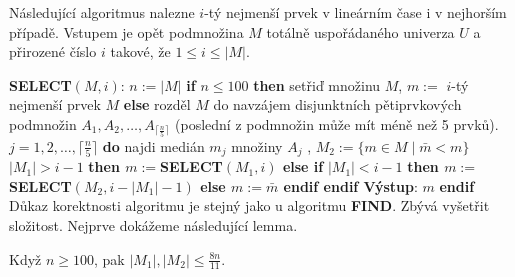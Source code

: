 \documentclass[a4paper,12pt]{article}
\begin{document}
Následující algoritmus nalezne $i$-tý nejmenší 
prvek v lineárním čase i v nejhorším případě.  Vstupem 
je opět podmnožina $M$ totálně 
uspořádaného univerza $U$ a přirozené číslo $i$ takové, že 
$1\le i\le |M|$.  

{\bf SELECT$(M,i)$}:\newline 
$n:=|M|$\newline 
{\bf if} $n\le 100$ {\bf then\newline 
\phantom{{\rm---}}}setřiď množinu $M$, $m:=$ $i$-tý nejmenší 
prvek $M$\newline 
{\bf else\newline 
\phantom{{\rm---}}}rozděl $M$ do navzájem disjunktních 
pětiprvkových podmnožin $A_1,A_2,\dots,A_{\lceil\frac n5\rceil}$\newline 
\phantom{---}(poslední z podmnožin může mít méně než 5 prvků).\newline 
{} $j=1,2,\dots,\lceil\frac n5\rceil$ {\bf do\newline 
\phantom{{\rm------}}}najdi medián $m_j$ množiny $A_j$\newline 
{}, $M_2:=\{m\in 
M\mid\bar {m}<m\}$\newline 
\phantom{---}{\bf if} $|M_1|>i-1$ {\bf then\newline 
\phantom{{\rm ------}}$m:=$SELECT$(M_1,i)$\newline 
\phantom{{\rm ---}}else\newline 
\phantom{{\rm------}}if} $|M_1|<i-1$ {\bf then\newline 
\phantom{{\rm ---------}}$m:=$SELECT$(M_2,i-|M_1|-1)$\newline 
\phantom{{\rm ------}}else\newline 
\phantom{{\rm ---------}}$m:=\bar {m}$\newline 
\phantom{{\rm ------}}endif\newline 
\phantom{{\rm ---}}endif\newline 
\phantom{{\rm ---}}Výstup}: $m$\newline 
{\bf endif
}
Důkaz korektnosti algoritmu je stejný 
jako u algoritmu {\bf FIND}. 
Zbývá vyšetřit složitost. Nej\-prve dokážeme následující 
lemma.

\begin{lemma}Když $n\ge 100$, pak $|M_1|,|M_2|\le\frac {8n}{
11}$.
\end{lemma}
\end{document}
